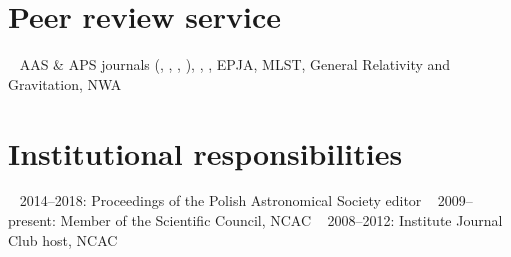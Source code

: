 \documentclass[]{friggeri-cv} %
\begin{document}
\setlength{\voffset}{0pt}
\begin{aside} 
\section{Peer review service}
~ 
AAS \& APS journals ({\apj}, {\apjl}, {\prd}, {\prl}), 
{\mnras}, {\aap}, EPJA, MLST, General Relativity and Gravitation, NWA 
~
~ 
\section{Institutional responsibilities}
~
2014--2018: Proceedings of the Polish Astronomical Society editor
~
2009--present: Member of the Scientific Council, NCAC 
~
2008--2012: Institute Journal Club host, NCAC
\end{aside} 


%  
\end{document}

